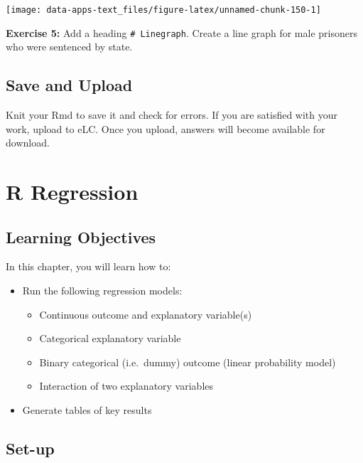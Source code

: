 \documentclass[
]{book}
\providecommand{\tightlist}{%
  \setlength{\itemsep}{0pt}\setlength{\parskip}{0pt}}
\newenvironment{rmdblock}[1]
  {\begin{shaded*}
  }
  {\end{shaded*}
  }
\newenvironment{learncheck}
  {\begin{rmdblock}{warning}}
  {\end{rmdblock}}
\begin{document}
\begin{center}\texttt{[image: data-apps-text\_files/figure-latex/unnamed-chunk-150-1]} \end{center}

\begin{learncheck}
\textbf{Exercise 5:} Add a heading \texttt{\#\ Linegraph}. Create a line
graph for male prisoners who were sentenced by state.
\end{learncheck}

\hypertarget{save-and-upload}{%
\section{Save and Upload}\label{save-and-upload}}

Knit your Rmd to save it and check for errors. If you are satisfied with your work, upload to eLC. Once you upload, answers will become available for download.

\hypertarget{r-regression}{%
\chapter{R Regression}\label{r-regression}}

\hypertarget{learning-objectives}{%
\section{Learning Objectives}\label{learning-objectives}}

In this chapter, you will learn how to:

\begin{itemize}
\tightlist
\item
  Run the following regression models:

  \begin{itemize}
  \tightlist
  \item
    Continuous outcome and explanatory variable(s)
  \item
    Categorical explanatory variable
  \item
    Binary categorical (i.e.~dummy) outcome (linear probability model)
  \item
    Interaction of two explanatory variables
  \end{itemize}
\item
  Generate tables of key results
\end{itemize}

\hypertarget{set-up}{%
\section{Set-up}\label{set-up}}
\end{document}

